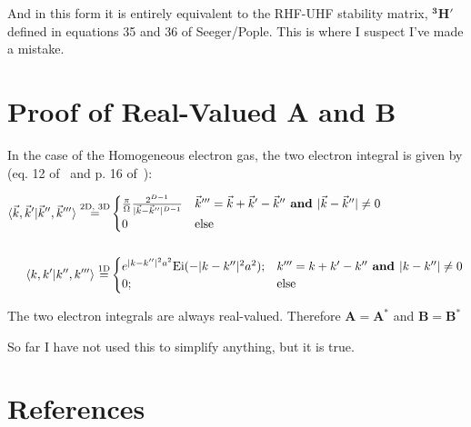 \documentclass{revtex4}
\begin{document}
And in this form it is entirely equivalent to the RHF-UHF stability
matrix, $\mathbf{{}^3H'}$ defined in equations 35 and 36 of
Seeger/Pople\cite{Seeger1977}. This is where I suspect I've made a mistake.
\\

\section{Proof of Real-Valued A and B}
In the case of the Homogeneous electron gas,
the two electron integral is given by
(eq. 12 of~\cite{Delyon2008} and p. 16 of~\cite{Guiliani2005}):

\begin{subequations}
\begin{align}
\braket{\vec{k}, \vec{k}'|\vec{k}'',\vec{k} '''}\stackrel{\text{2D, 3D}}{=}&
	\begin{cases}
	\frac{\pi}{\Omega}\frac{2^{D-1}}{|\vec{k}-\vec{k}''|^{D-1}}
	& \vec{k}''' = \vec{k}+\vec{k}'-\vec{k}'' \textbf{ and } |\vec{k}-\vec{k}''| \neq 0 \\
	0
	& \text{else}
	\end{cases}
\\ \nonumber \\
\braket{k, k'|k'',k'''}\stackrel{\text{1D}}{=}&
	\begin{cases}
	e^{|k-k''|^2a^2}\text{Ei}(-|k-k''|^2a^2)\text{;}
	& k''' = k + k'-k'' \textbf{ and } |k-k''| \neq 0 \\
	0\text{;}
	& \text{else}
	\end{cases}
\end{align}
\end{subequations}

The two electron integrals are always real-valued. Therefore
$\mathbf{A} = \mathbf{A}^*$ and $\mathbf{B} = \mathbf{B}^*$

So far I have not used this to simplify anything, but it is true.

\section{References}

\end{document}
